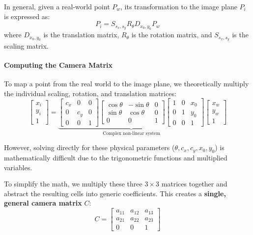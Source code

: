 In general, given a real-world point $P_w$, its transformation to the image plane $P_i$ is expressed as:
$$P_i = S_{s_x, s_y} R_{\theta} D_{x_0, y_0} P_w$$
where $D_{x_0, y_0}$ is the translation matrix, $R_{\theta}$ is the rotation matrix, and $S_{s_x, s_y}$ is the scaling matrix.

\paragraph{Computing the Camera Matrix}
To map a point from the real world to the image plane, we theoretically multiply the individual scaling, rotation, and translation matrices:
\[
    \begin{bmatrix} x_i \\ y_i \\ 1 \end{bmatrix} = 
    \underbrace{ 
        \begin{bmatrix} c_x & 0 & 0 \\ 0 & c_y & 0 \\ 0 & 0 & 1 \end{bmatrix} 
        \begin{bmatrix} \cos \theta & -\sin \theta & 0 \\ \sin \theta & \cos \theta & 0 \\ 0 & 0 & 1 \end{bmatrix} 
        \begin{bmatrix} 1 & 0 & x_0 \\ 0 & 1 & y_0 \\ 0 & 0 & 1 \end{bmatrix} 
    }_{\text{Complex non-linear system}}
    \begin{bmatrix} x_w \\ y_w \\ 1 \end{bmatrix} 
\]

However, solving directly for these physical parameters ($\theta, c_x, c_y, x_0, y_0$) is mathematically difficult due to the trigonometric functions and multiplied variables. 

To simplify the math, we multiply these three $3 \times 3$ matrices together and abstract the resulting cells into generic coefficients. 
This creates a \textbf{single, general camera matrix} $C$:
$$C = \begin{bmatrix} a_{11} & a_{12} & a_{13} \\ a_{21} & a_{22} & a_{23} \\ 0 & 0 & 1 \end{bmatrix}$$

